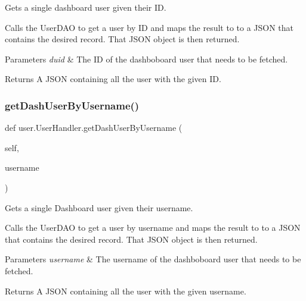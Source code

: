 Gets a single dashboard user given their ID. 

Calls the User\+D\+AO to get a user by ID and maps the result to to a J\+S\+ON that contains the desired record. That J\+S\+ON object is then returned.


\begin{DoxyParams}{Parameters}
{\em duid} & The ID of the dashboboard user that needs to be fetched.\\
\hline
\end{DoxyParams}
\begin{DoxyReturn}{Returns}
A J\+S\+ON containing all the user with the given ID. 
\end{DoxyReturn}
\mbox{\label{classuser_1_1_user_handler_a28c693c8d9c84ecde0151fdd97c69ee6}} 
\subsubsection{\texorpdfstring{get\+Dash\+User\+By\+Username()}{getDashUserByUsername()}}
{\footnotesize\ttfamily def user.\+User\+Handler.\+get\+Dash\+User\+By\+Username (\begin{DoxyParamCaption}\item[{}]{self,  }\item[{}]{username }\end{DoxyParamCaption})}



Gets a single Dashboard user given their username. 

Calls the User\+D\+AO to get a user by username and maps the result to to a J\+S\+ON that contains the desired record. That J\+S\+ON object is then returned.


\begin{DoxyParams}{Parameters}
{\em username} & The username of the dashboboard user that needs to be fetched.\\
\hline
\end{DoxyParams}
\begin{DoxyReturn}{Returns}
A J\+S\+ON containing all the user with the given username. 
\end{DoxyReturn}
\mbox{\label{classuser_1_1_user_handler_a7a6ab368d3ebce72188e6ef10c438f96}} 
